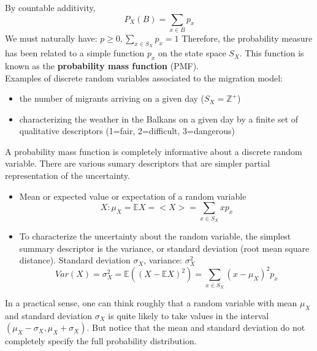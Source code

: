 \documentclass[12pt]{article}
\numberwithin{equation}{section}
\begin{document}
 By countable additivity,
 $$P_X(B)=\sum_{x\in B}p_x$$
 We must naturally have: $p\geq 0,\sum_{x\in S_X}p_x=1$ Therefore, the probability measure has been related to a simple function $p_x$ on the state space $S_X$. This function is known as the \textbf{probability mass function} (PMF). \\

 Examples of discrete random variables associated to the migration model:
 \begin{itemize}
 \item the number of migrants arriving on a given day ($S_X=\mathbb{Z}^+$)
 \item characterizing the weather in the Balkans on a given day by a finite set of qualitative descriptors (1=fair, 2=difficult, 3=dangerous)
 \end{itemize}

A probability mass function is completely informative about a discrete random variable. There are various sumary descriptors that are simpler partial representation of the uncertainty.
\begin{itemize}
\item Mean or expected value or expectation of a random variable
    $$X:\mu_X=\mathbb{E}X=<X>=\sum_{x\in S_X}xp_x$$
\item To characterize the uncertainty about the random variable, the simplest summary descriptor is the variance, or standard deviation (root mean square distance). Standard deviation $\sigma_X$, variance: $\sigma_X^2$
$$Var(X)=\sigma_X^2=\mathbb{E}((X-\mathbb{E}X)^2)=\sum_{x\in S_X}(x-\mu_X)^2p_x$$
\end{itemize}

In a practical sense, one can think roughly that a random variable with mean $\mu_X$ and standard deviation $\sigma_X$ is quite likely to take values in the interval $(\mu_X-\sigma_X,\mu_X+\sigma_X)$. But notice that the mean and standard deviation do not completely specify the full probability distribution.\\
\end{document}
